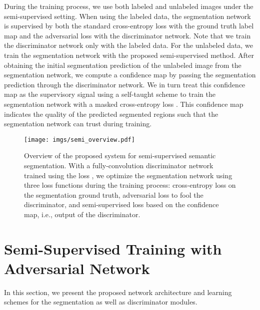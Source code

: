 \documentclass{bmvc2k}
\begin{document}
	
During the training process, we use both labeled and unlabeled images under the semi-supervised setting.
When using the labeled data, the segmentation network is supervised by both the standard cross-entropy loss  with the ground truth label map and the adversarial loss  with the discriminator network.
Note that we train the discriminator network only with the labeled data.
For the unlabeled data, we train the segmentation network with the proposed semi-supervised method. After obtaining the initial segmentation prediction of the unlabeled image from the segmentation network, we compute a confidence map by passing the segmentation prediction through the discriminator network.
We in turn treat this confidence map as the supervisory signal using a self-taught 
	scheme to train the segmentation network with 
	a masked cross-entropy loss .
This confidence map indicates the quality of 
	the predicted segmented regions such that the segmentation network can trust during training.
\begin{figure}[t]
		\centering
		\texttt{[image: imgs/semi\_overview.pdf]}\\
		\vspace{-3mm}
		\caption{Overview of the proposed system for semi-supervised semantic segmentation. With a fully-convolution discriminator network trained using the loss , we optimize the segmentation network using three loss functions during the training process: cross-entropy loss  on the segmentation ground truth, adversarial loss  to fool the discriminator, and semi-supervised loss  based on the confidence map, i.e., output of the discriminator.}
		\vspace{-0.5cm}
		\label{figure: semi_overview}
	\end{figure}
	\vspace{-3mm}
	
\section{Semi-Supervised Training with Adversarial Network}
	\vspace{-2mm}
	
	In this section, we present the proposed network architecture and learning schemes for the segmentation as well as discriminator modules.
	
\end{document}
